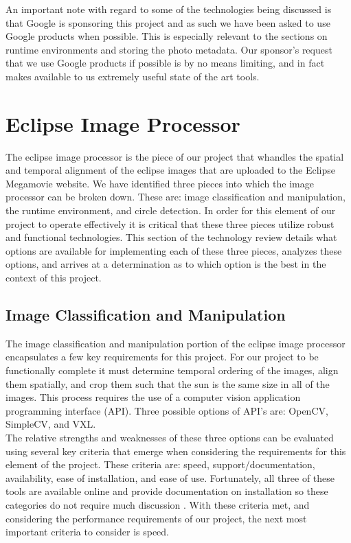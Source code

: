 \documentclass[10pt, onecolumn, draftclsnofoot, letterpaper, compsoc]{IEEEtran}
\begin{document}
An important note with regard to some of the technologies being discussed is
that Google is sponsoring this project and as such we have been asked to use
Google products when possible. This is especially relevant to the sections on
runtime environments and storing the photo metadata. Our sponsor's request that
we use Google products if possible is by no means limiting, and in fact makes
available to us extremely useful state of the art tools. \\


\section{Eclipse Image Processor}

The eclipse image processor is the piece of our project that whandles the spatial
and temporal alignment of the eclipse images that are uploaded to the Eclipse
Megamovie website. We have identified three pieces into which
the image processor can be broken down. These are: image classification and
manipulation, the runtime environment, and circle detection. In order for this
element of our project to operate effectively it is critical that these three
pieces utilize robust and functional technologies. This section of the
technology review details what options are available for implementing each of
these three pieces, analyzes these options, and arrives at a determination as to
which option is the best in the context of this project.\\

\subsection{Image Classification and Manipulation}

The image classification and manipulation portion of the eclipse image processor
encapsulates a few key requirements for this project. For our project to be
functionally complete it must determine temporal ordering of the images, align
them spatially, and crop them such that the sun is the same size in all of the
images. This process requires the use of a computer vision application
programming interface (API). Three possible options of API's are: OpenCV,
SimpleCV, and VXL. \\

The relative strengths and weaknesses of these three options can be evaluated
using several key criteria that emerge when considering the requirements for
this element of the project. These criteria are: speed, support/documentation,
availability, ease of installation, and ease of use. Fortunately, all three of
these tools are available online and provide documentation on installation so
these categories do not require much discussion \cite{OCV, VXL, SCV}. With these
criteria met, and considering the performance requirements of our project, the
next most important criteria to consider is speed. \\
\end{document}
